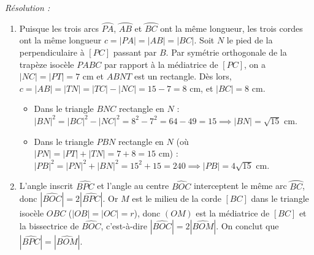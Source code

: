 \begin{exemple}
\begin{center}
\end{center}
\emph{Résolution :}
\begin{enumerate}[label=(\alph*)]
    \item Puisque les trois arcs $\wideparen{PA}$, $\wideparen{AB}$ et $\wideparen{BC}$ ont la même longueur, les trois cordes ont la même longueur $c = |PA| = |AB| = |BC|$. Soit $N$ le pied de la perpendiculaire à $[PC]$ passant par $B$. Par symétrie orthogonale de la trapèze isocèle $PABC$ par rapport à la médiatrice de $[PC]$, on a $|NC| = |PT| = 7\text{ cm}$ et $ABNT$ est un rectangle. Dès lors, $c = |AB| = |TN| = |TC| - |NC| = 15 - 7 = 8\text{ cm}$, et $|BC| = 8\text{ cm}$.
    \begin{itemize}
        \item Dans le triangle $BNC$ rectangle en $N$ : $|BN|^2 = |BC|^2 - |NC|^2 = 8^2 - 7^2 = 64 - 49 = 15 \implies |BN| = \sqrt{15}\text{ cm}$.
        \item Dans le triangle $PBN$ rectangle en $N$ (où $|PN| = |PT| + |TN| = 7 + 8 = 15\text{ cm}$) : $|PB|^2 = |PN|^2 + |BN|^2 = 15^2 + 15 = 240 \implies |PB| = \boxed{4\sqrt{15}\text{ cm}}$.
    \end{itemize}
    \item L'angle inscrit $\widehat{BPC}$ et l'angle au centre $\widehat{BOC}$ interceptent le même arc $\wideparen{BC}$, donc $|\widehat{BOC}| = 2|\widehat{BPC}|$. Or $M$ est le milieu de la corde $[BC]$ dans le triangle isocèle $OBC$ ($|OB| = |OC| = r$), donc $(OM)$ est la médiatrice de $[BC]$ et la bissectrice de $\widehat{BOC}$, c'est-à-dire $|\widehat{BOC}| = 2|\widehat{BOM}|$. On conclut que $|\widehat{BPC}| = |\widehat{BOM}|$.

\end{enumerate}
\end{exemple}
